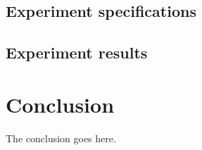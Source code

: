 \documentclass[conference,compsoc]{IEEEtran}
\begin{document}
\subsection{Experiment specifications}
\subsection{Experiment results}

\section{Conclusion}
The conclusion goes here.













%
%
%







\end{document}
